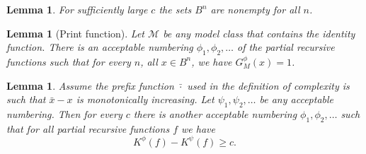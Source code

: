 \documentclass{article}
\newtheorem{lemma}[theorem]{Lemma}
\newcommand{\M}{\mathcal M}
\begin{document}
\begin{lemma}
  For sufficiently large $c$ the sets $B^n$ are nonempty for all $n$.
\end{lemma}

\begin{lemma}[Print function]
  Let $\M$ be any model class that contains the identity function. There is an acceptable numbering $\phi_1,\phi_2,\ldots$ of the partial recursive functions such that for every $n$, all $x\in B^n$, 
we have $G^\phi_M(x)=1$.
\end{lemma}

\begin{lemma}
Assume the prefix function $\bar\cdot$ used in the definition of complexity is such that $\bar x-x$ is monotonically increasing. Let $\psi_1,\psi_2,\ldots$ be any acceptable numbering. Then for every $c$ there is another acceptable numbering $\phi_1,\phi_2,\ldots$ such that for all partial recursive functions $f$ we have
\[
K^\phi(f)-K^\psi(f) \ge c.
\] \label{lemma:building-block}
\end{lemma}
\end{document}

